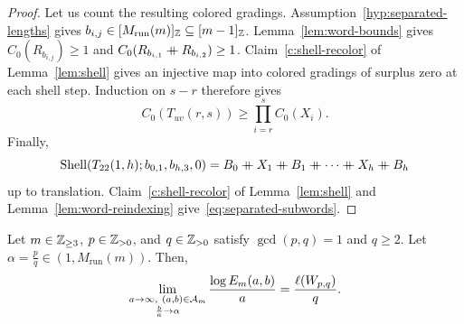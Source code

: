 \begin{proof}
Let us count the resulting colored gradings.
Assumption~\ref{hyp:separated-lengths} gives $b_{i,j}\in[M_{\mathrm{run}}(m)]_{\mathbb Z}\subseteq[m-1]_{\mathbb Z}$.
Lemma~\ref{lem:word-bounds} gives $C_0(R_{b_{i,j}})\ge1$ and
$C_0(R_{b_{i,1}}\mathbin{+\mkern-10mu+} R_{b_{i,2}})\ge1$.
Claim~\ref{c:shell-recolor} of Lemma~\ref{lem:shell} gives an injective map
into colored gradings of surplus zero at each shell step.
Induction on $s-r$ therefore gives
\[
 C_0(T_{uv}(r,s))\ge\prod_{i=r}^{s}C_0(X_i).
\]
Finally,
\[
 \operatorname{Shell}(T_{22}(1,h);b_{0,1},b_{h,3},0)
 =B_0\ccn X_1\ccn B_1\ccn \cdots\ccn X_h\ccn B_h
\]
up to translation. Claim~\ref{c:shell-recolor} of Lemma~\ref{lem:shell}
and Lemma~\ref{lem:word-reindexing} give~\eqref{eq:separated-subwords}.
\end{proof}

\begin{theorem}\label{thm:rational}
Let $m\in\mathbb Z_{\ge3}$, $p\in\mathbb Z_{>0}$, and $q\in\mathbb Z_{>0}$ satisfy $\gcd(p,q)=1$ and $q\ge2$.
Let $\alpha=\frac pq\in(1,M_{\mathrm{run}}(m))$.
Then,
\begin{equation}\label{eq:rational-limit}
 \lim_{\substack{a\to\infty,\ (a,b)\in\mathcal A_m\\\frac{b}{a}\to\alpha}}
 \frac{\log E_m(a,b)}a=\frac{\ell(W_{p,q})}q.
\end{equation}
\end{theorem}
